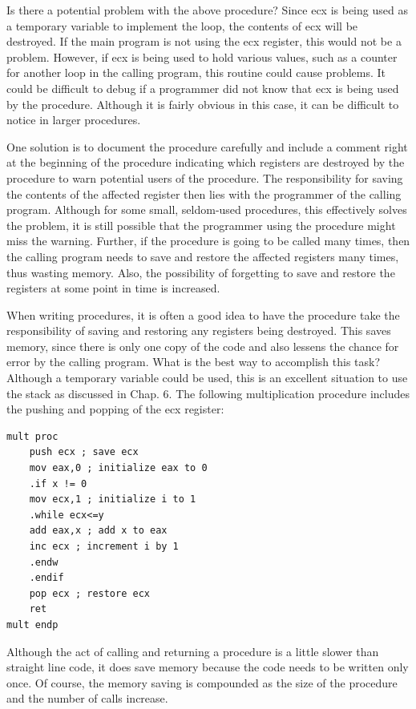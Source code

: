 \documentclass[10pt]{book}
\begin{document}
Is there a potential problem with the above procedure? Since ecx is being used as a temporary variable to implement the loop, the contents of ecx will be destroyed. If the main program is not using the ecx register, this would not be a problem. However, if ecx is being used to hold various values, such as a counter for another loop in the calling program, this routine could cause problems. It could be difficult to debug if a programmer did not know that ecx is being used by the procedure. Although it is fairly obvious in this case, it can be difficult to notice in larger procedures.

One solution is to document the procedure carefully and include a comment right at the beginning of the procedure indicating which registers are destroyed by the procedure to warn potential users of the procedure. The responsibility for saving the contents of the affected register then lies with the programmer of the calling program. Although for some small, seldom-used procedures, this effectively solves the problem, it is still possible that the programmer using the procedure might miss the warning. Further, if the procedure is going to be called many times, then the calling program needs to save and restore the affected registers many times, thus wasting memory. Also, the possibility of forgetting to save and restore the registers at some point in time is increased.

When writing procedures, it is often a good idea to have the procedure take the responsibility of saving and restoring any registers being destroyed. This saves memory, since there is only one copy of the code and also lessens the chance for error by the calling program. What is the best way to accomplish this task? Although a temporary variable could be used, this is an excellent situation to use the stack as discussed in Chap. 6. The following multiplication procedure includes the pushing and popping of the ecx register:

\begin{verbatim}
mult proc
    push ecx ; save ecx
    mov eax,0 ; initialize eax to 0
    .if x != 0
    mov ecx,1 ; initialize i to 1
    .while ecx<=y
    add eax,x ; add x to eax
    inc ecx ; increment i by 1
    .endw
    .endif
    pop ecx ; restore ecx
    ret
mult endp
\end{verbatim}

Although the act of calling and returning a procedure is a little slower than straight line code, it does save memory because the code needs to be written only once. Of course, the memory saving is compounded as the size of the procedure and the number of calls increase.
\end{document}

